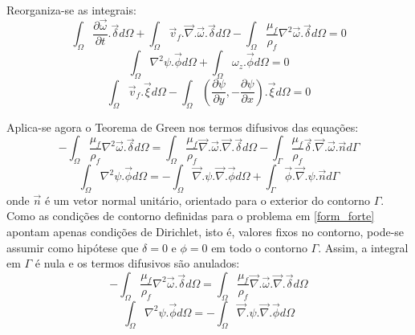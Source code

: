 Reorganiza-se as integrais:
\begin{equation}
    \int_{\Omega}
    \dfrac{\partial \vec{\omega}}{\partial t}
    .\vec{\delta} d\Omega +
    \int_{\Omega}
    \vec{v}_f.\vec{\nabla}.\vec{\omega}
    .\vec{\delta} d\Omega -
    \int_{\Omega}
    \dfrac{\mu_f}{\rho_f} \nabla^2 \vec{\omega}
    .\vec{\delta} d\Omega = 0
\end{equation}
\begin{equation}
    \int_{\Omega}
    \nabla^2\psi
    .\vec{\phi} d\Omega +
    \int_{\Omega}
    \omega_z
    .\vec{\phi} d\Omega = 0
\end{equation}
\begin{equation}
    \int_{\Omega}
    \vec{v}_f
    .\vec{\xi} d\Omega -
    \int_{\Omega}
    \left(\dfrac{\partial \psi}{\partial y},
    -\dfrac{\partial \psi}{\partial x} \right)
    .\vec{\xi} d\Omega = 0
\end{equation}

Aplica-se agora o Teorema de Green nos termos difusivos das equações:
\begin{equation}
    -\int_{\Omega}
    \dfrac{\mu_f}{\rho_f} \nabla^2 \vec{\omega}
    .\vec{\delta} d\Omega = 
    \int_{\Omega}
    \dfrac{\mu_f}{\rho_f}
    \vec{\nabla}.\vec{\omega}.\vec{\nabla}
    .\vec{\delta} d\Omega -
    \int_{\Gamma}
    \dfrac{\mu_f}{\rho_f}
    \vec{\delta}.\vec{\nabla}.\vec{\omega}
    .\vec{n} d\Gamma
\end{equation}
\begin{equation}
    \int_{\Omega}
    \nabla^2\psi
    .\vec{\phi} d\Omega = -
    \int_{\Omega}
    \vec{\nabla}.\psi.\vec{\nabla}
    .\vec{\phi} d\Omega +
    \int_{\Gamma}
    \vec{\phi}.\vec{\nabla}.\psi
    .\vec{n} d\Gamma
\end{equation}
onde $\vec{n}$ é um vetor normal unitário, orientado para o exterior do contorno $\Gamma$.
Como as condições de contorno definidas para o problema em \ref{form_forte} apontam apenas condições de Dirichlet, isto é, valores fixos no contorno, pode-se assumir como hipótese que $\delta=0$ e $\phi=0$ em todo o contorno $\Gamma$.
Assim, a integral em $\Gamma$ é nula e os termos difusivos são anulados:
\begin{equation}
    -\int_{\Omega}
    \dfrac{\mu_f}{\rho_f} \nabla^2 \vec{\omega}
    .\vec{\delta} d\Omega = 
    \int_{\Omega}
    \dfrac{\mu_f}{\rho_f}
    \vec{\nabla}.\vec{\omega}.\vec{\nabla}
    .\vec{\delta} d\Omega
\end{equation}
\begin{equation}
    \int_{\Omega}
    \nabla^2\psi
    .\vec{\phi} d\Omega = -
    \int_{\Omega}
    \vec{\nabla}.\psi.\vec{\nabla}
    .\vec{\phi} d\Omega
\end{equation}

